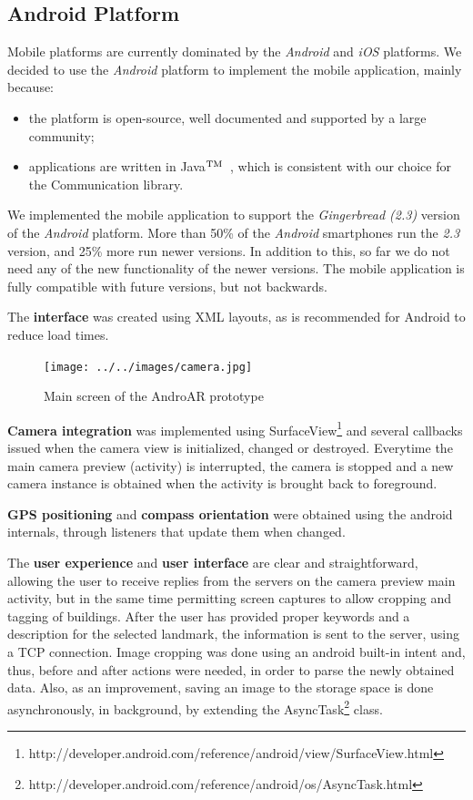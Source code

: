 \documentclass[a4paper,onecolumn,oneside,titlepage,11pt]{report}
\def\tm{\leavevmode\hbox{$\rm {}^{TM}$}}
\begin{document}
\subsection{Android Platform}
Mobile platforms are currently dominated by the \emph{Android} and \emph{iOS} platforms. We decided to use the \emph{Android} platform to implement the mobile application, mainly because:
\begin{itemize}
	\item the platform is open-source, well documented and supported by a large community;
	\item applications are written in Java\tm\ , which is consistent with our choice for the Communication library.
\end{itemize}
We implemented the mobile application to support the \emph{Gingerbread (2.3)} version of the \emph{Android} platform. More than 50\% of the \emph{Android} smartphones run the \emph{2.3} version, and 25\% more run newer versions. In addition to this, so far we do not need any of the new functionality of the newer versions. The mobile application is fully compatible with future versions, but not backwards.

The \textbf{interface} was created using XML layouts, as is recommended for Android to reduce load times.

\begin{figure}[H]
\begin{center}
\texttt{[image: ../../images/camera.jpg]}
\caption{Main screen of the AndroAR prototype}
\end{center}
\end{figure}

\textbf{Camera integration} was implemented using SurfaceView\footnote{http://developer.android.com/reference/android/view/SurfaceView.html} and several callbacks issued when the camera view is initialized, changed or destroyed. Everytime the main camera preview (activity) is interrupted, the camera is stopped and a new camera instance is obtained when the activity is brought back to foreground.

\textbf{GPS positioning} and \textbf{compass orientation} were obtained using the android internals,
through listeners that update them when changed.

The \textbf{user experience} and \textbf{user interface} are clear and straightforward, allowing the user to receive replies from the servers on the camera preview main activity, but in the same time permitting screen captures to allow cropping and tagging of buildings. After the user has provided proper keywords and a description for the selected landmark, the information is sent to the server, using a TCP connection.
Image cropping was done using an android built-in intent and, thus, before and after actions were needed, in order to parse the newly obtained data. Also, as an improvement, saving an image to the storage space is done asynchronously, in background, by extending the AsyncTask\footnote{http://developer.android.com/reference/android/os/AsyncTask.html} class.
\end{document}
